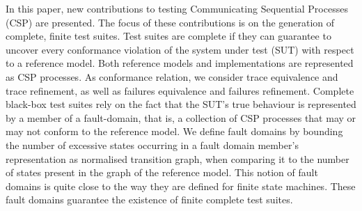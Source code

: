 In this paper, new contributions to testing Communicating Sequential Processes (CSP)
are presented. The focus of these contributions is on the generation of complete, finite
test suites. Test suites are complete if they can guarantee to uncover every 
conformance violation of the system under test (SUT) with respect to a reference model.
Both reference models and implementations are represented as CSP processes. As 
conformance relation, we consider trace equivalence and trace refinement, as well as 
failures equivalence and failures refinement. Complete black-box test suites rely on 
the fact that the SUT's true behaviour is represented by a member of a fault-domain, that is, a collection of CSP processes that may or may not conform to the reference 
model. We define fault domains by bounding the number of excessive states occurring 
in a fault domain member's representation as normalised transition graph, when comparing 
it to the number of states present in the graph of the reference model. This notion
of fault domains is quite close to the way they are defined for finite state machines.
These fault domains guarantee the existence of finite complete test suites.